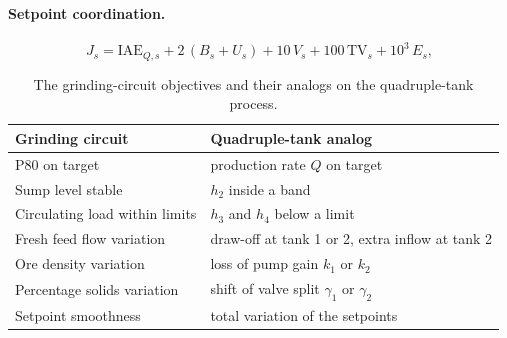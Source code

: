 \paragraph{Setpoint coordination.}

\begin{equation}
  J_s = \mathrm{IAE}_{Q,s} + 2\,(B_s + U_s) + 10\,V_s + 100\,\mathrm{TV}_s
        + 10^3\,E_s ,
  \label{eq:coord-score}
\end{equation}

\begin{table}[tb]
  \centering
  \caption{The grinding-circuit objectives and their analogs on the
    quadruple-tank process.}
  \label{tab:coord-analog}
  \begin{tabular}{@{}ll@{}}
    \toprule
    Grinding circuit & Quadruple-tank analog \\
    \midrule
    P80 on target                  & production rate $Q$ on target \\
    Sump level stable              & $h_2$ inside a band \\
    Circulating load within limits & $h_3$ and $h_4$ below a limit \\
    Fresh feed flow variation      & draw-off at tank 1 or 2, extra inflow at tank 2 \\
    Ore density variation          & loss of pump gain $k_1$ or $k_2$ \\
    Percentage solids variation    & shift of valve split $\gamma_1$ or $\gamma_2$ \\
    Setpoint smoothness            & total variation of the setpoints \\
    \bottomrule
  \end{tabular}
\end{table}

